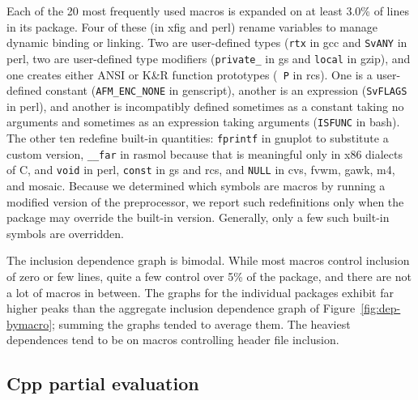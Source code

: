 \documentclass[10pt]{article}
\newcommand{\comment}[1]{\textbf{[[#1]]}}
\newcommand{\pkg}[1]{\textsf{#1}}
\begin{document}
Each of the 20 most frequently used macros is expanded on at least 3.0\% of
lines in its package.  Four of these (in \pkg{xfig} and \pkg{perl}) rename
variables to manage dynamic binding or linking.  Two are user-defined types
({\tt rtx} in \pkg{gcc} and {\tt SvANY} in \pkg{perl}, two are user-defined
type modifiers (\verb|private_| in \pkg{gs} and \verb|local| in
\pkg{gzip}), and one creates either ANSI or K\&R function prototypes ({\tt
P} in \pkg{rcs}).  One is a user-defined constant (\verb|AFM_ENC_NONE| in
\pkg{genscript}), another is an expression ({\tt SvFLAGS} in \pkg{perl}),
and another is incompatibly defined sometimes as a constant taking no
arguments and sometimes as an expression taking arguments ({\tt ISFUNC} in
\pkg{bash}).  The other ten redefine built-in quantities:  {\tt fprintf} in
\pkg{gnuplot} to substitute a custom version, \verb|__far| in \pkg{rasmol}
because that is meaningful only in x86 dialects of C, and {\tt void} in
\pkg{perl}, {\tt const} in \pkg{gs} and \pkg{rcs}, and {\tt NULL} in
\pkg{cvs}, \pkg{fvwm}, \pkg{gawk}, \pkg{m4}, and \pkg{mosaic}.  
Because we determined which symbols are macros by running a modified
version of the preprocessor, we report such redefinitions only when the
package may override the built-in version.  Generally, only a few such
built-in symbols are overridden.


The inclusion dependence graph is bimodal.  While most macros control
inclusion of zero or few lines, quite a few control over 5\% of the
package, and there are not a lot of macros in between.  The graphs for the
individual packages exhibit far higher peaks than the aggregate inclusion
dependence graph of Figure~\ref{fig:dep-bymacro}; summing the graphs tended
to average them.  The heaviest dependences tend to be on macros controlling
header file inclusion.




\subsection{Cpp partial evaluation}

\end{document}

